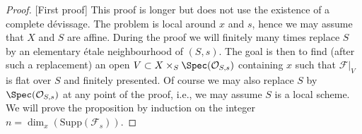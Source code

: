 \begin{proof}
[First proof]
This proof is longer but does not use the existence of a complete d\'evissage.
The problem is local around $x$ and $s$, hence we may assume that $X$
and $S$ are affine. During the proof we will finitely many times replace
$S$ by an elementary \'etale neighbourhood of $(S, s)$. The goal is then to find
(after such a replacement) an open
$V \subset X \times_S \Spec(\mathcal{O}_{S, s})$ containing $x$
such that $\mathcal{F}|_V$ is flat over $S$ and finitely presented.
Of course we may also replace $S$ by $\Spec(\mathcal{O}_{S, s})$
at any point of the proof, i.e., we may assume $S$ is a local scheme.
We will prove the proposition by induction on the integer
$n = \dim_x(\text{Supp}(\mathcal{F}_s))$.


\end{proof}
